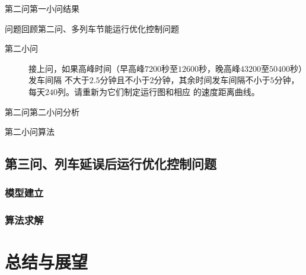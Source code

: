 \documentclass{beamer}
\begin{document}
\begin{frame}{第二问第一小问结果}

\end{frame}

\begin{frame}{问题回顾}{第二问、多列车节能运行优化控制问题}
\begin{description}
  \item[第二小问] 接上问，如果高峰时间（早高峰$7200$秒至$12600$秒，晚高峰$43200$至$50400$秒）发车间隔
  不大于$2.5$分钟且不小于$2$分钟，其余时间发车间隔不小于$5$分钟，每天$240$列。请重新为它们制定运行图和相应
  的速度距离曲线。
\end{description}
\end{frame}

\begin{frame}{第二问第二小问分析}

\end{frame}

\begin{frame}{第二小问算法}

\end{frame}




\subsection{第三问、列车延误后运行优化控制问题}
\subsubsection{模型建立}
\subsubsection{算法求解}
\section{总结与展望}
\end{document}
